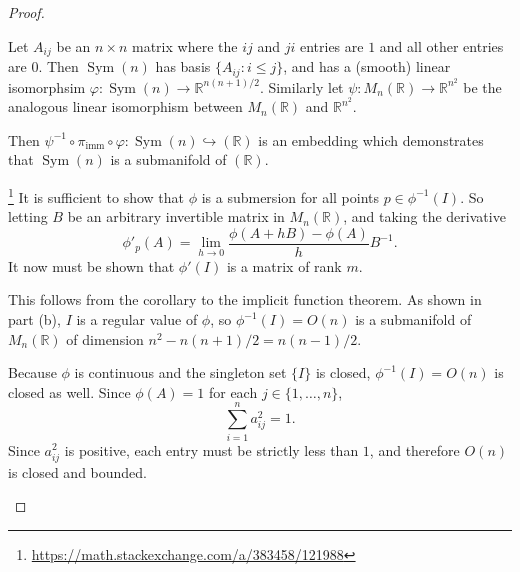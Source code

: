 \documentclass{article}
\newenvironment{problempart}[1]{\begin{trivlist}\item[\textbf{Part #1.}]}{\end{trivlist}}
\begin{document}
\begin{proof} \text{\\}
  \begin{problempart}{(a)}
    Let $A_{ij}$ be an $n\times n$ matrix where the $ij$ and $ji$ entries are $1$
    and all other entries are $0$. Then $\operatorname{Sym}(n)$ has basis
    $\{A_{ij} : i \leq j\}$, and has a (smooth) linear isomorphsim
    $\varphi:\operatorname{Sym}(n) \rightarrow \mathbb{R}^{n(n+1)/2}$. Similarly
    let $\psi: M_n(\mathbb{R}) \rightarrow \mathbb{R}^{n^2}$ be the analogous
    linear isomorphism between $ M_n(\mathbb{R})$ and $\mathbb{R}^{n^2}$.

    Then $\psi^{-1} \circ \pi_\text{imm} \circ \varphi: \operatorname{Sym}(n) \hookrightarrow (\mathbb{R})$
    is an embedding which demonstrates that $\operatorname{Sym}(n)$ is a submanifold of $(\mathbb{R})$.
  \end{problempart}
  \begin{problempart}{(b)}\footnote{\url{https://math.stackexchange.com/a/383458/121988}}
    It is sufficient to show that $\phi$ is a submersion for all points
    $p\in\phi^{-1}(I)$. So letting $B$ be an arbitrary invertible matrix in
    $M_n(\mathbb{R})$, and taking the derivative \[
      \phi'_p(A) = \lim_{h \rightarrow 0} \frac{\phi(A + hB) - \phi(A)}{h}B^{-1}.
    \]
    It now must be shown that $\phi'(I)$ is a matrix of rank $m$.
  \end{problempart}
  \begin{problempart}{(c)}
    This follows from the corollary to the implicit function theorem. As shown in
    part (b), $I$ is a regular value of $\phi$, so $\phi^{-1}(I) = O(n)$ is a
    submanifold of $M_n(\mathbb{R})$ of dimension $n^2 - n(n+1)/2 = n(n-1)/2$.
  \end{problempart}
  \begin{problempart}{(d)}
    Because $\phi$ is continuous and the singleton set $\{ I \}$ is closed,
    $\phi^{-1}(I) = O(n)$ is closed as well.
    Since $\phi(A) = 1$ for each $j \in \{ 1,\hdots,n\}$, \[
      \sum_{i=1}^{n} a_{ij}^2 = 1.
    \]
    Since $a_{ij}^2$ is positive, each entry must be strictly less than $1$, and
    therefore $O(n)$ is closed and bounded.
  \end{problempart}
\end{proof}

\pagebreak
\end{document}
